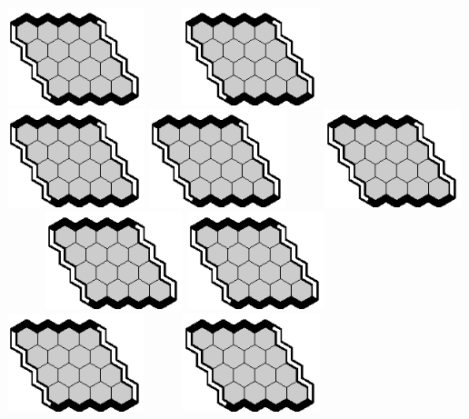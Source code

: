 \documentclass[12pt]{article}
\begin{document}
\begin{center}
\includegraphics[width=40mm]{fz/pix/4x4.eps}~~~~~~\includegraphics[width=40mm]{fz/pix/4x4.eps}~~~~~~\includegraphics[width=40mm]{fz/pix/4x4.eps}\vfill
\includegraphics[width=40mm]{fz/pix/4x4.eps}~~~~~~\includegraphics[width=40mm]{fz/pix/4x4.eps}~~~~~~\includegraphics[width=40mm]{fz/pix/4x4.eps}\vfill
\includegraphics[width=40mm]{fz/pix/4x4.eps}~~~~~~\includegraphics[width=40mm]{fz/pix/4x4.eps}~~~~~~\includegraphics[width=40mm]{fz/pix/4x4.eps}\vfill

\end{center}
\end{document}
